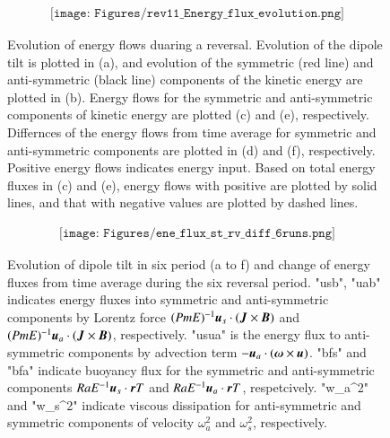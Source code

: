 %
\begin{figure}[ht]
\begin{center}
\[
\begin{array}{c}
\texttt{[image: Figures/rev11\_Energy\_flux\_evolution.png]}
\end{array}
\]
\end{center}
\caption{
Evolution of energy flows duaring a reversal. Evolution of the dipole tilt is plotted in (a), and evolution of the symmetric (red line) and anti-symmetric (black line) components of the kinetic energy are plotted in (b). Energy flows for the symmetric and anti-symmetric components of kinetic energy are plotted (c) and (e), respectively. Differnces of the energy flows from time average for symmetric and anti-symmetric components are plotted in (d) and (f), respectively. Positive energy flows indicates energy input. Based on total energy fluxes in (c) and (e), energy flows with positive are plotted by solid lines, and that with negative values are plotted by dashed lines.}
\label{Fig:Change_flux_summary_6grp}
\end{figure}
%

%
\begin{figure}[ht]
\begin{center}
\[
\begin{array}{c}
\texttt{[image: Figures/ene\_flux\_st\_rv\_diff\_6runs.png]}
\end{array}
\]
\end{center}
\caption{
Evolution of dipole tilt in six period (a to f) and change of energy fluxes from time average during the six reversal period. "usb", "uab" indicates energy fluxes into symmetric and anti-symmetric components by Lorentz force $(Pm E)^{-1} \mbox{\boldmath$u$}_{s} \cdot (\mbox{\boldmath$J$} \times \mbox{\boldmath$B$})$ and $(Pm E)^{-1} \mbox{\boldmath$u$}_{a} \cdot (\mbox{\boldmath$J$} \times \mbox{\boldmath$B$})$, respectively. "usua" is the energy flux to anti-symmetric components by advection term $-\mbox{\boldmath$u$}_{a} \cdot(\mbox{\boldmath$\omega$} \times \mbox{\boldmath$u$})$. "bfs" and "bfa" indicate buoyancy flux for the symmetric and anti-symmetric components $Ra E^{-1} \mbox{\boldmath$u$}_{s} \cdot \mbox{\boldmath$r$} T$ and $Ra E^{-1} \mbox{\boldmath$u$}_{a} \cdot \mbox{\boldmath$r$} T$, respetcively. "w\_a\textasciicircum 2" and "w\_s\textasciicircum 2" indicate viscous dissipation for anti-symmetric and symmetric components of velocity $\omega_{a}^2$ and $\omega_{s}^2$, respectively.
}
\label{Fig:Change_flux_summary_6grp}
\end{figure}
